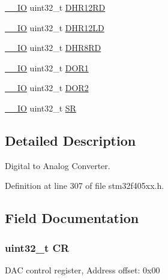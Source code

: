 \begin{DoxyCompactItemize}
\item 
\hyperlink{core__sc300_8h_aec43007d9998a0a0e01faede4133d6be}{\+\_\+\+\_\+\+IO} uint32\+\_\+t \hyperlink{struct_d_a_c___type_def_a1590b77e57f17e75193da259da72095e}{D\+H\+R12\+RD}
\item 
\hyperlink{core__sc300_8h_aec43007d9998a0a0e01faede4133d6be}{\+\_\+\+\_\+\+IO} uint32\+\_\+t \hyperlink{struct_d_a_c___type_def_acc269320aff0a6482730224a4b641a59}{D\+H\+R12\+LD}
\item 
\hyperlink{core__sc300_8h_aec43007d9998a0a0e01faede4133d6be}{\+\_\+\+\_\+\+IO} uint32\+\_\+t \hyperlink{struct_d_a_c___type_def_a9590269cba8412f1be96b0ddb846ef44}{D\+H\+R8\+RD}
\item 
\hyperlink{core__sc300_8h_aec43007d9998a0a0e01faede4133d6be}{\+\_\+\+\_\+\+IO} uint32\+\_\+t \hyperlink{struct_d_a_c___type_def_aa710505be03a41981c35bacc7ce20746}{D\+O\+R1}
\item 
\hyperlink{core__sc300_8h_aec43007d9998a0a0e01faede4133d6be}{\+\_\+\+\_\+\+IO} uint32\+\_\+t \hyperlink{struct_d_a_c___type_def_aba9fb810b0cf6cbc1280c5c63be2418b}{D\+O\+R2}
\item 
\hyperlink{core__sc300_8h_aec43007d9998a0a0e01faede4133d6be}{\+\_\+\+\_\+\+IO} uint32\+\_\+t \hyperlink{struct_d_a_c___type_def_af6aca2bbd40c0fb6df7c3aebe224a360}{SR}
\end{DoxyCompactItemize}


\subsection{Detailed Description}
Digital to Analog Converter. 

Definition at line 307 of file stm32f405xx.\+h.



\subsection{Field Documentation}
\subsubsection[{\texorpdfstring{CR}{CR}}]{ uint32\+\_\+t CR}\hypertarget{struct_d_a_c___type_def_ab40c89c59391aaa9d9a8ec011dd0907a}{}\label{struct_d_a_c___type_def_ab40c89c59391aaa9d9a8ec011dd0907a}
D\+AC control register, Address offset\+: 0x00 

